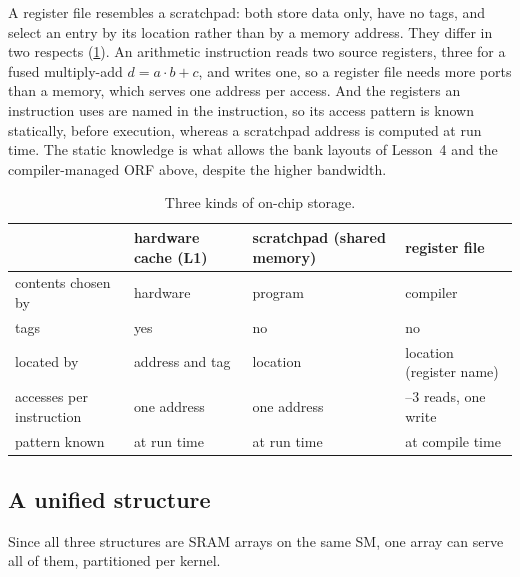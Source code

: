 \documentclass[../main.tex]{subfiles}
\begin{document}
A register file resembles a scratchpad: both store data only, have no
tags, and select an entry by its location rather than by a memory
address.  They differ in two respects (\cref{tab:l06-storage}).  An
arithmetic instruction reads two source registers, three for a fused
multiply-add $d = a \cdot b + c$, and writes one, so a
register file needs more ports than a memory, which serves one address
per access.  And the registers an instruction uses are named in the
instruction, so its access pattern is known statically, before
execution, whereas a scratchpad address is computed at run time.  The
static knowledge is what allows the bank layouts of Lesson~4 and the
compiler-managed ORF above, despite the higher bandwidth.

\begin{table}[tb]
  \centering
  \caption{Three kinds of on-chip storage.}
  \label{tab:l06-storage}
  \setlength{\tabcolsep}{4pt}
  \begin{tabular}{@{}>{\raggedright\arraybackslash}p{30mm}
                  >{\raggedright\arraybackslash}p{22mm}
                  >{\raggedright\arraybackslash}p{24mm}
                  >{\raggedright\arraybackslash}p{36mm}@{}}
    \toprule
    & hardware cache (L1) & scratchpad (shared memory) & register file \\
    \midrule
    contents chosen by & hardware & program & compiler \\
    tags & yes & no & no \\
    located by & address and tag & location & location (register name) \\
    \addlinespace
    accesses per instruction & one address & one address & 2--3 reads, one write \\
    pattern known & at run time & at run time & at compile time \\
    \bottomrule
  \end{tabular}
\end{table}

\subsection{A unified structure}

Since all three structures are SRAM arrays on the same SM, one array
can serve all of them, partitioned per kernel.
\end{document}

